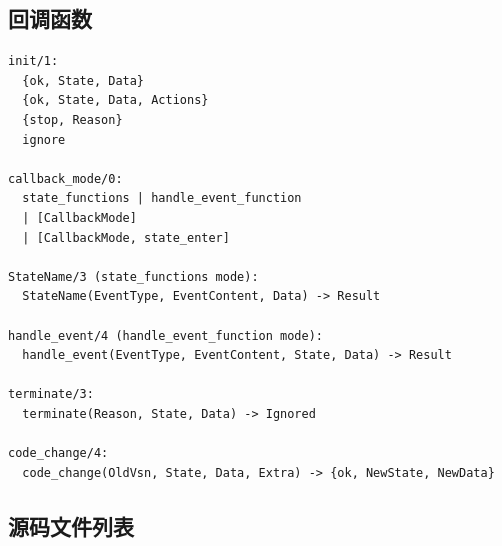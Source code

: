\documentclass[a4paper,11pt]{article}
\begin{document}
\subsection{回调函数}

\begin{lstlisting}[style=erlangstyle]
init/1:
  {ok, State, Data}
  {ok, State, Data, Actions}
  {stop, Reason}
  ignore

callback_mode/0:
  state_functions | handle_event_function
  | [CallbackMode]
  | [CallbackMode, state_enter]

StateName/3 (state_functions mode):
  StateName(EventType, EventContent, Data) -> Result

handle_event/4 (handle_event_function mode):
  handle_event(EventType, EventContent, State, Data) -> Result

terminate/3:
  terminate(Reason, State, Data) -> Ignored

code_change/4:
  code_change(OldVsn, State, Data, Extra) -> {ok, NewState, NewData}
\end{lstlisting}

\subsection{源码文件列表}
\end{document}
